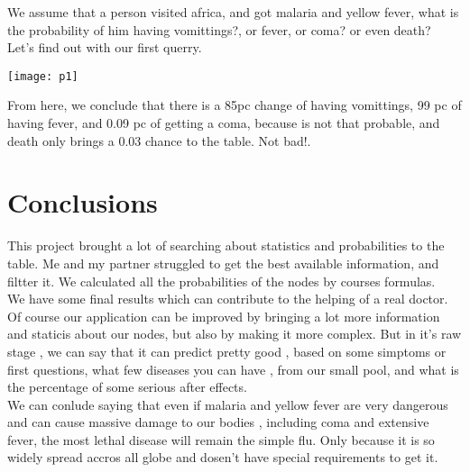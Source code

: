 \tab We assume that a person visited africa, and got malaria and yellow fever, what is the probability of him having vomittings?, or fever, or coma? or even death? Let's find out with our first querry.\\

\begin{center}
  	\texttt{[image: p1]}
\end{center}

\tab From here, we conclude that there is a 85pc change of having vomittings, 99 pc of having fever, and 0.09 pc of getting a coma, because is not that probable, and death only brings a 0.03 chance to the table. Not bad!.\\


\section{Conclusions}
\tab This project brought a lot of searching about statistics and probabilities to the table. Me and my partner
struggled to get the best available information, and filtter it. We calculated all the probabilities of the nodes
by courses formulas.\\
\tab We have some final results which can contribute to the helping of a real doctor. Of course our application can be improved
by bringing a lot more information and staticis about our nodes, but also by making it more complex.
But in it's raw stage , we can say that it can predict pretty good , based on some simptoms or first questions,
what few diseases you can have , from our small pool, and what is the percentage of some serious after effects.\\
\tab We can conlude saying that even if malaria and yellow fever are very dangerous and can cause massive damage to 
our bodies , including coma and extensive fever, the most lethal disease will remain the simple flu. Only because 
it is so widely spread accros all globe and dosen't have special requirements to get it.\\